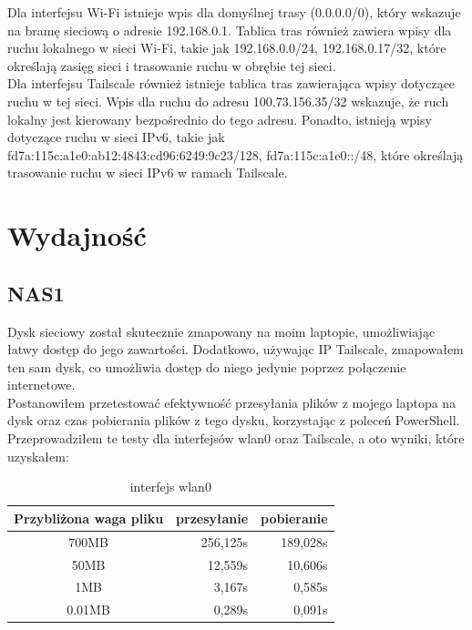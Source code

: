 \documentclass{article}
\begin{document}
Dla interfejsu Wi-Fi istnieje wpis dla domyślnej trasy (0.0.0.0/0), który wskazuje na bramę sieciową o adresie 192.168.0.1. Tablica tras również zawiera wpisy dla ruchu lokalnego w sieci Wi-Fi, takie jak 192.168.0.0/24, 192.168.0.17/32, które określają zasięg sieci i trasowanie ruchu w obrębie tej sieci.\\

Dla interfejsu Tailscale również istnieje tablica tras zawierająca wpisy dotyczące ruchu w tej sieci. Wpis dla ruchu do adresu 100.73.156.35/32 wskazuje, że ruch lokalny jest kierowany bezpośrednio do tego adresu. Ponadto, istnieją wpisy dotyczące ruchu w sieci IPv6, takie jak fd7a:115c:a1e0:ab12:4843:cd96:6249:9c23/128, fd7a:115c:a1e0::/48, które określają trasowanie ruchu w sieci IPv6 w ramach Tailscale.\\

\section{Wydajność}
\subsection*{NAS1}
Dysk sieciowy został skutecznie zmapowany na moim laptopie, umożliwiając łatwy dostęp do jego zawartości. Dodatkowo, używając IP Tailscale, zmapowałem ten sam dysk, co umożliwia dostęp do niego jedynie poprzez połączenie internetowe.\\

Postanowiłem przetestować efektywność przesyłania plików z mojego laptopa na dysk oraz czas pobierania plików z tego dysku, korzystając z poleceń PowerShell. Przeprowadziłem te testy dla interfejsów wlan0 oraz Tailscale, a oto wyniki, które uzyskałem:\\

\begin {table} [H]
    \begin {center}

        \label {Tabela 3}
        \begin {tabular} { |c|r|r| }
            \hline
            Przybliżona waga pliku & przesyłanie & pobieranie \\
            \hline
            700MB & 256,125s & 189,028s \\
            \hline
            50MB & 12,559s & 10,606s \\
            \hline
            1MB & 3,167s & 0,585s \\
            \hline
            0.01MB & 0,289s & 0,091s \\
            \hline
        \end {tabular}
        \caption {interfejs wlan0}
    \end {center}
\end {table}
\end{document}
